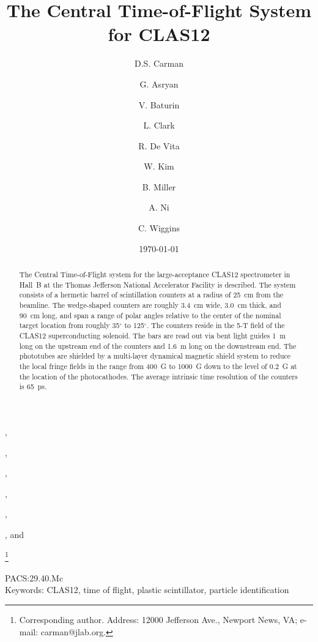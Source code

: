\documentclass{elsart}
\begin{document}
\begin{frontmatter}

\title{The Central Time-of-Flight System for CLAS12}

\author[JLAB]{D.S. Carman},
\author[JLAB]{G. Asryan},
\author[JLAB]{V. Baturin},
\author[Glasgow]{L. Clark}
\author[INFN]{R. De Vita}
\author[KNU]{W. Kim}, 
\author[JLAB]{B. Miller},
\author[KNU]{A. Ni}, and
\author[JLAB]{C. Wiggins} 

\address[JLAB]{Thomas Jefferson National Accelerator Facility, Newport News, VA 23606, USA}
\address[Glasgow]{University of Glasgow, Glasgow G12 8QQ, United Kingdom}
\address[INFN]{INFN, Sezione di Genova, 16146 Genova, Italy}
\address[KNU]{Kyungpook National University, Daegu 41566, Republic of Korea} 
\thanks[corresponding]{Corresponding author. Address: 12000 Jefferson Ave., Newport News, VA; 
e-mail: carman@jlab.org.}

\date{\today}


\begin{abstract}
The Central Time-of-Flight system for the large-acceptance CLAS12 spectrometer in Hall~B at 
the Thomas Jefferson National Accelerator Facility is described. The system consists of a 
hermetic barrel of scintillation counters at a radius of 25~cm from the beamline. The 
wedge-shaped counters are roughly 3.4~cm wide, 3.0~cm thick, and 90~cm long, and span a range 
of polar angles relative to the center of the nominal target location from roughly 35$^\circ$ 
to 125$^\circ$. The counters reside in the 5-T field of the CLAS12 superconducting solenoid. 
The bars are read out via bent light guides 1~m long on the upstream end of the counters and 1.6~m
long on the downstream end. The phototubes are shielded by a multi-layer dynamical magnetic shield
system to reduce the local fringe fields in the range from 400~G to 1000~G down to the level of 0.2~G
at the location of the photocathodes. The average intrinsic time resolution of the counters is 65~ps.
\end{abstract}

\end{frontmatter}

PACS:29.40.Mc \\
Keywords: CLAS12, time of flight, plastic scintillator, particle identification
\newpage
\end{document}
